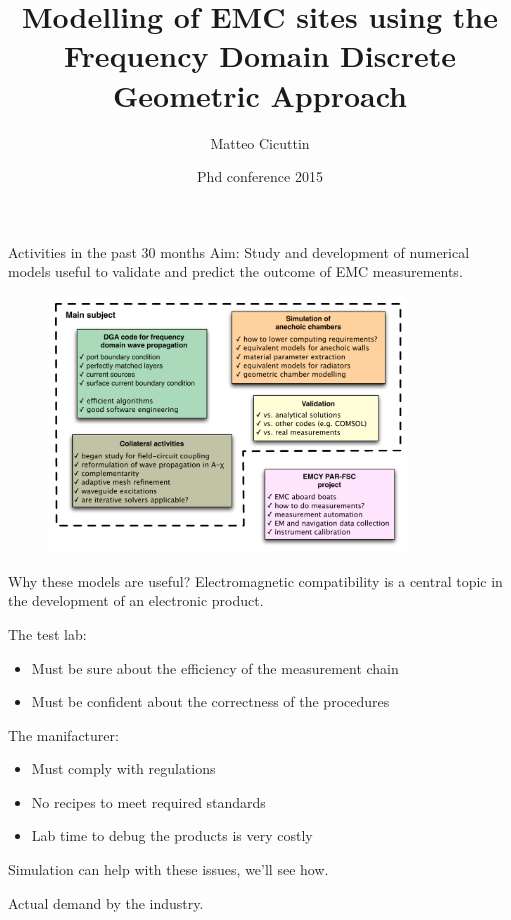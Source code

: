 \documentclass{beamer}
\title{Modelling of EMC sites using the Frequency Domain Discrete Geometric Approach\\\phantom{xxx}}
\date{Phd conference 2015}
\author{Matteo Cicuttin}
\begin{document}
\begin{frame}
\titlepage
\end{frame}

\begin{frame}{Activities in the past 30 months}
    Aim: Study and development of numerical models useful to validate and predict the outcome of EMC measurements.
    \begin{figure}
        \centering
        \includegraphics[width=0.85\textwidth]{img/activities.pdf}
    \end{figure}
\end{frame}

\begin{frame}{Why these models are useful?}
    Electromagnetic compatibility is a central topic in the development of an electronic product.
    \vspace{5mm}

    \begin{minipage}{0.45\textwidth}
        The test lab:
        \begin{itemize}
            \item Must be sure about the efficiency of the measurement chain
            \item Must be confident about the correctness of the procedures
        \end{itemize}
    \end{minipage}
    \begin{minipage}{0.45\textwidth}
        The manifacturer:
        \begin{itemize}
            \item Must comply with regulations
            \item No recipes to meet required standards
            \item Lab time to debug the products is very costly
        \end{itemize}
    \end{minipage}

    \vspace{5mm}
    Simulation can help with these issues, we'll see how. 
    
    \textcolor{uniud-orange}{Actual demand by the industry.}

\end{frame}
\end{document}
